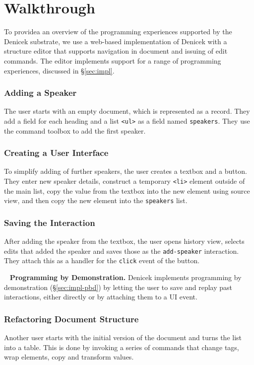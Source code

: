 \documentclass[sigconf,anonymous,screen]{acmart}
\newcommand*\circled[1]{\textnormal{\footnotesize\sffamily\bfseries\protect\tikz[baseline=(char.base)]{
  \node[shape=circle,fill=black,text=white,draw,inner sep=1pt] (char) {#1};}}}
\DeclareRobustCommand{\keyideabox}[3]{\begin{tcolorbox}[breakable,
  boxsep=5pt,left=0pt,right=0pt,top=0pt,bottom=0pt,width=\dimexpr\columnwidth\relax,
  colback=gray!20,colframe=gray!20,
  enlarge bottom by=0pt,enlarge top by=0pt,
  arc=0pt,outer arc=0pt]
\lettrine[lraise=0.3]{\LARGE #1}{~}
\small \textbf{#2.} #3
\end{tcolorbox}
}
\begin{document}
\newpage


\section{Walkthrough}
\label{sec:walk}

To providea an overview of the programming experiences supported by the Denicek
substrate, we use a web-based implementation of Denicek with a structure
editor that supports navigation in document and issuing of edit commands. The editor
implements support for a range of programming experiences, discussed in \S\ref{sec:impl}.

\subsubsection*{\circled{A} Adding a Speaker}
The user starts with an empty document, which is represented as a record. They add a field for
each heading and a list {\small\Verb_<ul>_} as a field named {\small\Verb_speakers_}. They use the command
toolbox to add the first speaker.

\subsubsection*{\circled{B} Creating a User Interface} To simplify adding of
further speakers, the user creates a textbox and a button. They enter new speaker
details, construct a temporary {\small\Verb_<li>_} element outside of the main list, copy the value
from the textbox into the new element using source view, and then copy the new element into the
{\small\Verb_speakers_} list.

\subsubsection*{\circled{C} Saving the Interaction} After adding the speaker from the textbox,
the user opens history view, selects edits that added the speaker and saves those as the
{\small\Verb_add-speaker_} interaction. They attach this as a handler for the {\small\Verb_click_} event of the button.

\keyideabox{\faLightbulbO}{Programming by Demonstration}{Denicek implements programming by
demonstration (\S\ref{sec:impl-pbd}) by letting the user to save and replay past interactions,
either directly or by attaching them to a UI event.}

\subsubsection*{\circled{D} Refactoring Document Structure} Another user starts with the initial
version of the document and turns the list into a table. This is done by invoking a series of
commands that change tags, wrap elements, copy and transform values.
\end{document}
